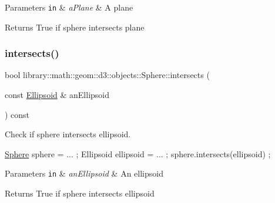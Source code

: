 \begin{DoxyParams}[1]{Parameters}
\mbox{\tt in}  & {\em a\+Plane} & A plane \\
\hline
\end{DoxyParams}
\begin{DoxyReturn}{Returns}
True if sphere intersects plane 
\end{DoxyReturn}
\mbox{\label{classlibrary_1_1math_1_1geom_1_1d3_1_1objects_1_1_sphere_ad278cbe34b3fde84126202d772f9df27}} 
\subsubsection{\texorpdfstring{intersects()}{intersects()}\hspace{0.1cm}{\footnotesize\ttfamily [7/8]}}
{\footnotesize\ttfamily bool library\+::math\+::geom\+::d3\+::objects\+::\+Sphere\+::intersects (\begin{DoxyParamCaption}\item[{const \hyperlink{classlibrary_1_1math_1_1geom_1_1d3_1_1objects_1_1_ellipsoid}{Ellipsoid} \&}]{an\+Ellipsoid }\end{DoxyParamCaption}) const}



Check if sphere intersects ellipsoid. 


\begin{DoxyCode}
\hyperlink{classlibrary_1_1math_1_1geom_1_1d3_1_1objects_1_1_sphere_a55dccc8ea16ee55cd7694c26afa8ea39}{Sphere} sphere = ... ;
Ellipsoid ellipsoid = ... ;
sphere.intersects(ellipsoid) ;
\end{DoxyCode}



\begin{DoxyParams}[1]{Parameters}
\mbox{\tt in}  & {\em an\+Ellipsoid} & An ellipsoid \\
\hline
\end{DoxyParams}
\begin{DoxyReturn}{Returns}
True if sphere intersects ellipsoid 
\end{DoxyReturn}
\mbox{\label{classlibrary_1_1math_1_1geom_1_1d3_1_1objects_1_1_sphere_a698e81554ca85819741fdfdcd123e8a1}} 
